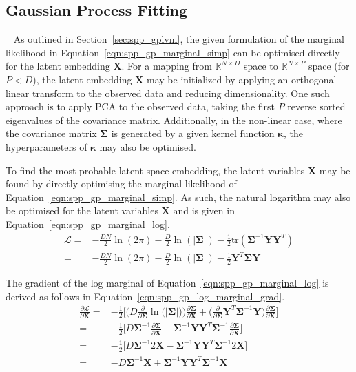 \subsection{Gaussian Process Fitting}
~\label{subsec:spp_gp_fitting}
As outlined in Section~\ref{sec:spp_gplvm}, the given formulation of the marginal likelihood 
in Equation~\ref{eqn:spp_gp_marginal_simp} can be optimised directly for the latent embedding 
\( \bm{X} \). For a mapping from \(\mathbb{R}^{N \times D} \) space to \(\mathbb{R}^{N \times P} \)
space (for \( P < D \)), the latent embedding \( \bm{X} \) may be initialized by applying an 
orthogonal linear transform to the observed data and reducing dimensionality. One such approach 
is to apply PCA to the observed data, taking the first \(P\) reverse sorted eigenvalues of the 
covariance matrix. Additionally, in the non-linear case, where the covariance matrix \( \bm{\Sigma} \) 
is generated by a given kernel function \( \bm{\kappa} \), the hyperparameters of \( \bm{\kappa} \) may 
also be optimised.

To find the most probable latent space embedding, the latent variables \( \bm{X} \) may be 
found by directly optimising the marginal likelihood of Equation~\ref{eqn:spp_gp_marginal_simp}. 
As such, the natural logarithm may also be optimised for the latent variables \( \bm{X} \) and 
is given in Equation~\ref{eqn:spp_gp_marginal_log}.
\begin{align}
  \label{eqn:spp_gp_marginal_log}
  \mathcal{L} ={}& -\frac{DN}{2} \ln(2\pi)
  -\frac{D}{2} \ln(\left| \bm{\Sigma} \right|)
  -\frac{1}{2} \text{tr}(\bm{\Sigma}^{-1} \bm{YY}^{T})\\
  ={}& -\frac{DN}{2} \ln(2\pi)
  -\frac{D}{2} \ln(\left| \bm{\Sigma} \right|)
  -\frac{1}{2} \bm{Y}^{T}\bm{\Sigma}\bm{Y}
\end{align}

The gradient of the log marginal of Equation~\ref{eqn:spp_gp_marginal_log} 
is derived as follows in Equation~\ref{eqn:spp_gp_log_marginal_grad}.
\begin{align}
  \label{eqn:spp_gp_log_marginal_grad}
  \frac{\partial \mathcal{L}}{\partial \bm{X}} ={}&
  -\frac{1}{2} \Bigg[
    \Big( D \frac{\partial}{\partial \bm{\Sigma}} 
    \ln \big( \left| \bm{\Sigma} \right| \big) \Big) 
    \frac{\partial \bm{\Sigma}}{\partial \bm{X}}
    + \Big( \frac{\partial}{\partial \bm{\Sigma}}
    \bm{Y}^{T} \bm{\Sigma}^{-1} \bm{Y} \Big)
    \frac{\partial \bm{\Sigma}}{\partial \bm{X}}
  \Bigg]\\
  ={}& -\frac{1}{2} \Bigg[
    D \bm{\Sigma}^{-1} \frac{\partial \bm{\Sigma}}{\partial \bm{X}}
    - \bm{\Sigma}^{-1} \bm{YY}^{T} \bm{\Sigma}^{-1} 
    \frac{\partial \bm{\Sigma}}{\partial \bm{X}}
  \Bigg]\\
  ={}& -\frac{1}{2} \Bigg[
    D \bm{\Sigma}^{-1} 2 \bm{X}
    - \bm{\Sigma}^{-1} \bm{YY}^{T} \bm{\Sigma}^{-1} 2 \bm{X}
  \Bigg]\\
  ={}& -D \bm{\Sigma}^{-1} \bm{X}
  + \bm{\Sigma}^{-1} \bm{YY}^{T} \bm{\Sigma}^{-1} \bm{X}
\end{align}

